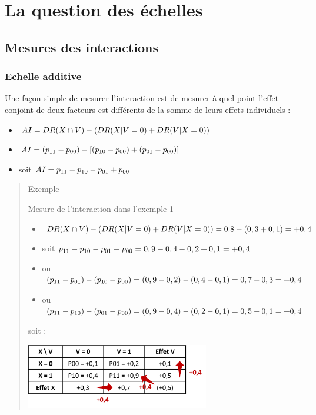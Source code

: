 \documentclass[
]{book}
\providecommand{\tightlist}{%
  \setlength{\itemsep}{0pt}\setlength{\parskip}{0pt}}
\begin{document}
\hypertarget{echelle}{%
\chapter{La question des échelles}\label{echelle}}

\hypertarget{mesures-des-interactions}{%
\section{Mesures des interactions}\label{mesures-des-interactions}}

\hypertarget{echelle-additive}{%
\subsection*{Echelle additive}\label{echelle-additive}}

Une façon simple de mesurer l'interaction est de mesurer à quel point l'effet conjoint de deux facteurs est différents de la somme de leurs effets individuels \citet{vanderweele_tutorial_2014} :

\begin{itemize}
\tightlist
\item
  \(\small AI = DR(X\cap V) - (DR(X|V=0) + DR(V|X=0))\)
\item
  \(\small AI = (p_{11} - p_{00}) - [(p_{10} - p_{00}) + (p_{01} - p_{00})]\)
\item
  soit \(\small AI =p_{11} - p_{10} - p_{01} + p_{00}\)
\end{itemize}

\begin{quote}
Exemple

Mesure de l'interaction dans l'exemple 1

\begin{itemize}
\tightlist
\item
  \(\small DR(X\cap V) - (DR(X|V=0) + DR(V|X=0)) = 0.8 - (0,3 + 0,1) = +0,4\)
\item
  soit \(\small p_{11} - p_{10} - p_{01} + p_{00} = 0,9 - 0,4 - 0,2 + 0,1 = +0,4\)
\item
  ou \(\small (p_{11} - p_{01}) - (p_{10} - p_{00}) = (0,9 - 0,2) - (0,4 - 0,1) = 0,7 - 0,3 = +0,4\)
\item
  ou \(\small (p_{11} - p_{10}) - (p_{01} - p_{00}) = (0,9 - 0,4) - (0,2 - 0,1) = 0,5 - 0,1 = +0,4\)
\end{itemize}

soit :

\includegraphics[width=0.65\textwidth,height=\textheight]{img/Image2.png}
\end{quote}
\end{document}
